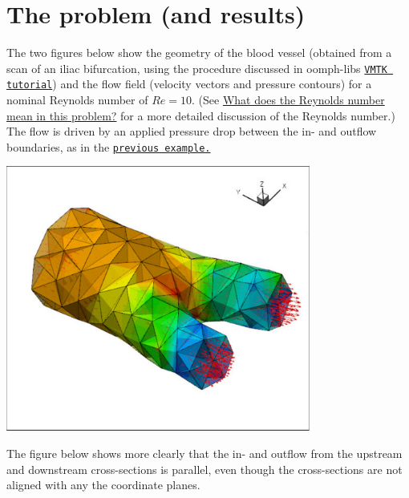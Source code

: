  

\hypertarget{index_problem}{}\section{The problem (and results)}\label{index_problem}
The two figures below show the geometry of the blood vessel (obtained from a scan of an iliac bifurcation, using the procedure discussed in {\ttfamily oomph-\/lib\textquotesingle{}s} \href{../../../meshes/mesh_from_vmtk/html/index.html}{\tt V\+M\+TK tutorial}) and the flow field (velocity vectors and pressure contours) for a nominal Reynolds number of $ Re = 10. $ (See \hyperlink{index_re}{What does the Reynolds number mean in this problem?} for a more detailed discussion of the Reynolds number.) The flow is driven by an applied pressure drop between the in-\/ and outflow boundaries, as in the \href{../../unstructured_three_d_fluid/html/index.html}{\tt previous example.}

 
\begin{DoxyImage}
\includegraphics[width=0.75\textwidth]{vmtk_fluid}
\end{DoxyImage}


The figure below shows more clearly that the in-\/ and outflow from the upstream and downstream cross-\/sections is parallel, even though the cross-\/sections are not aligned with any the coordinate planes.

